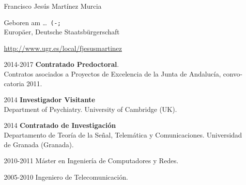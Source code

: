 %
%
%

\begin{otherlanguage}{spanish}
\begin{cv}{}
    \begin{cvlist}{}\label{PersDat}  
        \item   Francisco Jesús Martínez Murcia
        \item   Geboren am \dots\ \texttt{(-;} \\	
                Europ\"aer, Deutsche Staatsb\"urgerschaft 
        \item   \url{http://www.ugr.es/local/fjesusmartinez}			
    \end{cvlist}
    
	\begin{cvlist}{}
		\item[2014-2017] \textbf{Contratado Predoctoral}. \\
		Contratos asociados a Proyectos de Excelencia de la Junta de Andalucía, convocatoria 2011. 
		\item[2014] \textbf{Investigador Visitante}\\ Department of Psychiatry. University of Cambridge (UK).
		\item[2014] \textbf{Contratado de Investigación}\\ Departamento de Teoría de la Señal, Telemática y Comunicaciones. Universidad de Granada (Granada). 
	\end{cvlist}

	\begin{cvlist}{}\label{education}
	\item[2010-2011] Máster en Ingeniería de Computadores y Redes.
	\item[2005-2010] Ingeniero de Telecomunicación.
	\end{cvlist}


\end{cv}
\end{otherlanguage}
